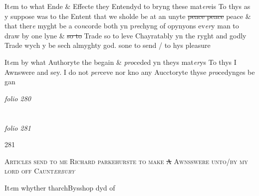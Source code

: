 \documentclass[12pt, a4paper]{book}
\begin{document}
				\marginpar[\vspace{0.5cm}{\textcolor{Gray}{11}}]{}
			

		\ifthenelse{\isodd{\thepage}}
		{\reversemarginpar}
		{\normalmarginpar}
		 It\textit{e}m to what Ende \& Effecte they Entendyd to bryng these mat\textit{er}eis
To thys as y suppose was to the Entent that we sholde be at an unyte
\sout{peace peace} peace \& that ther\textit{e} myght be a co\textit{n}corde both yn p\textit{re}chyng
of opynyons ev\textit{er}y man to draw by one lyne \& \sout{so to} Trade so to leve
Chayratably yn the ryght and godly Trade wych y be sech almyghty
god. sone to send / to hys pleasure
 	
				\marginpar[\vspace{0.5cm}{\textcolor{Gray}{12}}]{}
			

		\ifthenelse{\isodd{\thepage}}
		{\reversemarginpar}
		{\normalmarginpar}
		 It\textit{e}m by what Authoryte the begain \& \textit{pro}ceded yn theys mat\textit{er}ys
To thys I Awnswere and sey. I do not \textit{per}ceve nor kno any Aucctoryte 
thyse \textit{pro}cedynges be gan

\dotfill
						\newpage
{}

\textit{folio 280}


         \vspace*{4cm}
         
\dotfill
						  \section*{}  \subsection*{}

\textit{folio 281}



            		\begin{flushright}{\color{Mahogany}281}\end{flushright}


				\begin{center}  {\scshape Articles send to me Richard parkehurste to make \sout{A} Awnsswere
unto/by my lord off Caunt\textit{erbury}}  \end{center}
			
            		It\textit{e}m whyther tharchBysshop dyd of
            			
\end{document}
